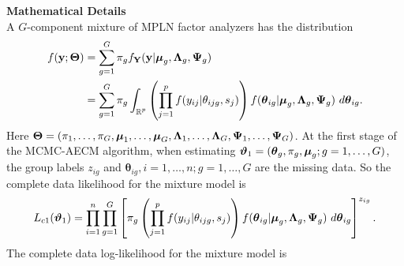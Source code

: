 \documentclass[12pt]{article}
\newcommand{\vecmu}{\mbox{\boldmath$\mu$}}
\DeclareMathOperator{\R}{\mathbb{R}}
\begin{document}
\noindent \textbf{Mathematical Details} \\
\noindent A $G$-component mixture of MPLN factor analyzers has the distribution
\begin{equation*}
\begin{split}
f(\mathbf{y};\boldsymbol{\Theta}) & = \sum_{g=1}^G\pi_gf_{\mathbf{Y}}(\mathbf{y}|\vecmu_g,\mathbf{\Lambda}_g, \mathbf{\Psi}_g)  \\
& = \sum_{g=1}^{G}  \pi_g \int_{\R^p} \left( \prod _{j=1}^p f(y_{ij}| \theta_{ijg}, s_j) \right) f(\boldsymbol{\theta}_{ig}|\vecmu_g,\mathbf{\Lambda}_g, \mathbf{\Psi}_g) ~d\boldsymbol{\theta}_{ig}.
\end{split}
\end{equation*}
Here $\boldsymbol{\Theta} = (\pi_1, \ldots, \pi_G, \vecmu_1, \ldots, \vecmu_G, \mathbf{\Lambda}_1, \ldots, \mathbf{\Lambda}_G, \mathbf{\Psi}_1, \ldots, \mathbf{\Psi}_G)$. At the first stage of the MCMC-AECM algorithm, when estimating $\boldsymbol{\vartheta}_1 =(\boldsymbol{\theta}_g, \pi_g, \vecmu_g; g = 1, \ldots, G)$, the group labels $z_{ig}$ and $\boldsymbol{\theta}_{ig}, i = 1,\ldots, n; g = 1,\ldots, G$ are the missing data. So the complete data likelihood for the mixture model is
\begin{equation*}
L_{c1}(\boldsymbol{\vartheta}_1) = \prod_{i=1}^{n} \prod_{g=1}^{G} \left[  \pi_g \left( \prod _{j=1}^p f(y_{ij}| \theta_{ijg}, s_j) \right) f(\boldsymbol{\theta}_{ig}|\vecmu_g,\mathbf{\Lambda}_g, \mathbf{\Psi}_g) ~d\boldsymbol{\theta}_{ig} \right]^{z_{ig}}. 
\end{equation*}
The complete data log-likelihood for the mixture model is
\end{document}
